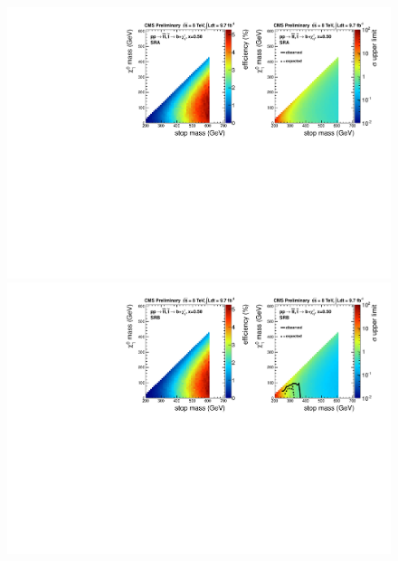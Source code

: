 
\begin{figure}[hbt]
  \begin{center}
        \includegraphics[width=1.\linewidth]{plots/T2bw_x50_SRA.pdf}
        \includegraphics[width=1.\linewidth]{plots/T2bw_x50_SRB.pdf}

\end{center}
\end{figure}
